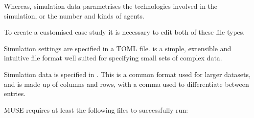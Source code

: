 \documentclass[letterpaper,10pt,english]{sphinxmanual}
\begin{document}
Whereas, simulation data parametrises the technologies involved in the simulation, or the number and kinds of agents.

To create a customised case study it is necessary to edit both of these file types.

Simulation settings are specified in a TOML file.  is a simple, extensible and intuitive file format well suited for specifying small sets of complex data.

Simulation data is specified in . This is a common format used for larger datasets, and is made up of columns and rows, with a comma used to differentiate between entries.

MUSE requires at least the following files to successfully run:
\end{document}

